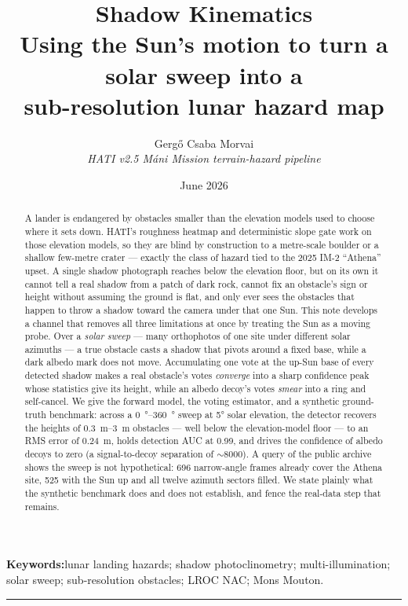 \documentclass[11pt]{article}
\title{\sffamily\bfseries\color{hatiblue}\LARGE Shadow Kinematics\\[3pt]
\Large\mdseries Using the Sun's motion to turn a solar sweep into a\\ sub-resolution lunar hazard map}
\author{\large Gergő Csaba Morvai\\[2pt]
\normalsize\itshape HATI v2.5 \textendash{} M\'ani Mission terrain-hazard pipeline}
\date{\normalsize June 2026}
\begin{document}
\maketitle

\begin{abstract}
\noindent
A lander is endangered by obstacles smaller than the elevation models used to choose
where it sets down. HATI's roughness heatmap and deterministic slope gate work on those
elevation models, so they are blind by construction to a metre-scale boulder or a shallow
few-metre crater --- exactly the class of hazard tied to the 2025 IM-2 ``Athena'' upset.
A single shadow photograph reaches below the elevation floor, but on its own it cannot
tell a real shadow from a patch of dark rock, cannot fix an obstacle's sign or height
without assuming the ground is flat, and only ever sees the obstacles that happen to throw
a shadow toward the camera under that one Sun. This note develops a channel that removes
all three limitations at once by treating the Sun as a moving probe. Over a \emph{solar
sweep} --- many orthophotos of one site under different solar azimuths --- a true obstacle
casts a shadow that pivots around a fixed base, while a dark albedo mark does not move.
Accumulating one vote at the up-Sun base of every detected shadow makes a real obstacle's
votes \emph{converge} into a sharp confidence peak whose statistics give its height, while
an albedo decoy's votes \emph{smear} into a ring and self-cancel. We give the forward
model, the voting estimator, and a synthetic ground-truth benchmark: across a
\SIrange{0}{360}{\degree} sweep at \ang{5} solar elevation, the detector recovers the
heights of \SIrange{0.3}{3}{\meter} obstacles --- well below the elevation-model floor ---
to an RMS error of \SI{0.24}{\meter}, holds detection AUC at \num{0.99}, and drives the
confidence of albedo decoys to zero (a signal-to-decoy separation of $\sim$\num{8000}). A
query of the public archive shows the sweep is not hypothetical: \num{696} narrow-angle
frames already cover the Athena site, \num{525} with the Sun up and all twelve azimuth
sectors filled. We state plainly what the synthetic benchmark does and does not establish,
and fence the real-data step that remains.
\end{abstract}

\noindent\textbf{\sffamily\color{hatiblue}Keywords:}\enspace lunar landing hazards;
shadow photoclinometry; multi-illumination; solar sweep; sub-resolution obstacles; LROC NAC; Mons Mouton.

\medskip\hrule\medskip
\end{document}
